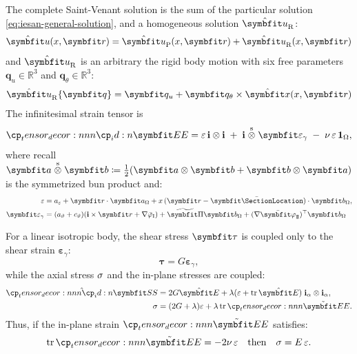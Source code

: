 %
The complete Saint-Venant solution is the sum of the particular solution \eqref{eq:iesan-general-solution}, 
and a homogeneous solution \(\hat{\bm u}_{\rm R}\):
\begin{equation}
\hat{\bm{u}}(x,\bm{r}) = \hat{\bm{u}}_{\rm P}(x,\bm{r}) + \hat{\bm{u}}_{\rm R}(x,\bm{r})
\label{eq:general-solution}
\end{equation}
and \(\hat{\bm{u}}_{\rm R}\) is an arbitrary the rigid body motion with six free parameters \(\bm{q}_u\in \mathbb{R}^3\) and \(\bm{q}_\theta\in \mathbb{R}^3\):
\begin{equation}
\begin{aligned}
\hat{\bm u}_{\rm R}\{\bm{q}\} 
&= \bm{q}_u + \bm{q}_\theta \times \hat{\bm{x}}(\reflenx,\bm{r}) \\
\end{aligned}
\label{eq:rigid-field}
\end{equation}
%
The infinitesimal strain tensor is
\[
\StrainTensor
= \PointAxialStrain\,\FrameBasis\otimes\FrameBasis
\;+\;\FrameBasis\symbun \bm{\varepsilon}_{\gamma}
\;-\;\nu\,\PointAxialStrain\,\oneS,
\]
where recall \(\bm{a}\symbun\bm{b} \coloneq \tfrac{1}{2} (\bm{a}\otimes\bm{b} + \bm{b}\otimes\bm{a})\) is the symmetrized bun product and:
\begin{subequations}
\begin{align}
\PointAxialStrain
&= a_{\varepsilon} + \bm{r}\cdot\bm{a}_{\Section}
+ x\,(\bm{r}-\CentroidLocation)\cdot\bm{b}_{\Section},
 \label{eq:iesan-point-axial-strain} \\
%
\PointShearStrain 
&= (a_{\vartheta} + c_{\vartheta})(\FrameBasis\times \bm{r} + \nabla\WarpTwistIesan) 
+\PlaneShearShape\bm{b}_{\Section}
+ (\nabla \WarpShearShape{})^{\top} \bm{b}_{\Section} 
\label{eq:iesan-point-shear-strain}
\end{align}
\label{eq:iesan-point-strain}
\end{subequations}

\begin{Note}
For a linear isotropic body, the shear stress \(\ShearStress\) is coupled only to the shear strain \(\bm{\varepsilon}_{\gamma}\):
\[
\bm{\tau} = G\bm{\varepsilon}_{\gamma},
\]
while the axial stress \(\sigma\) and the in-plane stresses are coupled:
\[
\begin{aligned}
\hat{\StressTensor}
&= 2G \hat{\bm{E}}+\lambda (\PointAxialStrain + \operatorname{tr} \hat{\bm{E}}) \; \FrameBasis_{\alpha} \otimes \FrameBasis_{\alpha}, \\
\AxialStress
&=(2 G+\lambda) \PointAxialStrain+\lambda \operatorname{tr} \PlaneStrainTensor.
\end{aligned}
\]
Thus, if the in-plane strain \(\PlaneStrainTensor\) satisfies:
\begin{equation*}
\operatorname{tr}\PlaneStrainTensor = -2\nu\,\PointAxialStrain
\quad\text{then}\quad 
\AxialStress = E\,\PointAxialStrain.
\end{equation*}
\end{Note}

